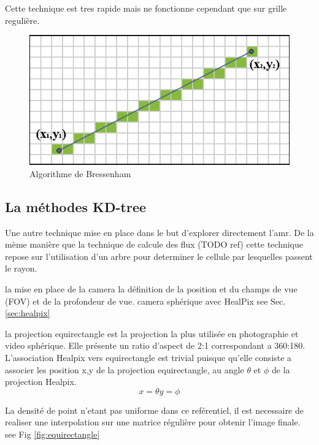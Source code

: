 Cette technique est tres rapide mais ne fonctionne cependant que sur grille regulière.

\begin{figure}[bth]
        \includegraphics[width=.95\linewidth]{img/04/Bresenham_line.png} 
        \caption{Algorithme de Bressenham }
 		\label{fig:bressenham}
\end{figure}




\subsection{La méthodes KD-tree}

Une autre technique mise en place dans le but d'explorer directement l'amr.
De la mème manière que la technique de calcule des flux (TODO ref) cette technique repose sur l'utilisation d'un arbre pour determiner le cellule par lesquelles passent le rayon.





la mise en place de la camera
la définition de la position et du champs de vue (FOV) et de la profondeur de vue.
camera sphérique avec HealPix see Sec. \ref{sec:healpix}

la projection equirectangle est la projection la plus utilisée en photographie et video sphérique.
Elle présente un ratio d'aspect de 2:1 correspondant a 360:180.
L'association Healpix vers equirectangle est trivial puisque qu'elle consiste a associer les position x,y de la projection equirectangle, au angle $\theta$ et $\phi$ de la projection Healpix.
\begin{equation}
x=\theta
y=\phi
\end{equation}

La densité de point n'etant pas uniforme dans ce reférentiel, il est necessaire de realiser une interpolation sur une matrice régulière pour obtenir l'image finale. see Fig \ref{fig:equirectangle}


